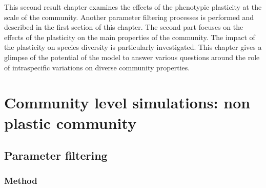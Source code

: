 
%
%

\begin{fullwidth}
This second result chapter examines the effects of the phenotypic plasticity at the scale of the community. Another parameter filtering processes is performed and described in the first section of this chapter. The second part focuses on the effects of the plasticity on the main properties of the community. The impact of the plasticity on species diversity is particularly investigated. This chapter gives a glimpse of the potential of the model to answer various questions around the role of intraspecific variations on diverse community properties.
\end{fullwidth}

\chapter{Community level simulations: non plastic community}


\section{Parameter filtering}
\subsection{Method}

